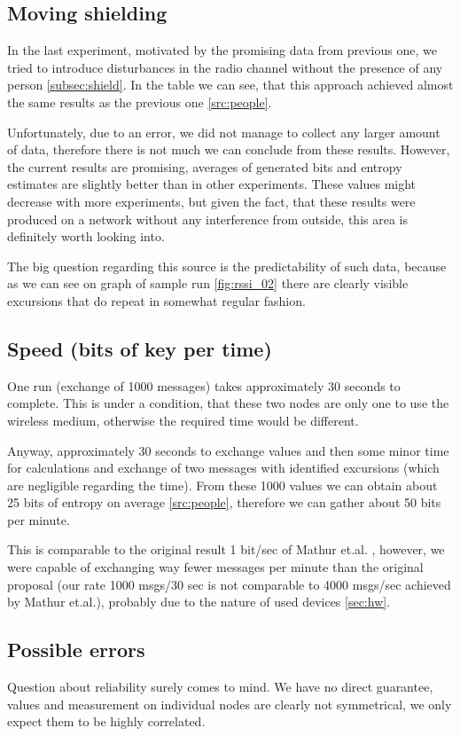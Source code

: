 \documentclass[
  print, %
  table,   %
  nolof,     %
  nolot,     %
           oneside
]{fithesis3}
\begin{document}
  \subsection{Moving shielding}\label{src:shield}
  In the last experiment, motivated by the promising data from previous one, we tried to introduce disturbances in the radio channel without the presence of any person \ref{subsec:shield}. In the table we can see, that this approach achieved almost the same results as the previous one \ref{src:people}.

  Unfortunately, due to an error, we did not manage to collect any larger amount of data, therefore there is not much we can conclude from these results. However, the current results are promising, averages of generated bits and entropy estimates are slightly better than in other experiments.  These values might decrease with more experiments, but given the fact, that these results were produced on a network without any interference from outside, this area is definitely worth looking into.

  The big question regarding this source is the predictability of such data, because as we can see on graph of sample run \ref{fig:rssi_02}
  there are clearly visible excursions that do repeat in somewhat regular fashion.


  \subsection{Speed (bits of key per time)}
  One run (exchange of 1000 messages) takes approximately 30 seconds to complete. This is under a condition, that these two nodes are only one to use the wireless medium, otherwise the required time would be different.

  Anyway, approximately 30 seconds to exchange values and then some minor time for calculations and exchange of two messages with identified excursions (which are negligible regarding the time).  From these 1000 values we can obtain about 25 bits of entropy on average \ref{src:people}, therefore we can gather about 50 bits per minute.

  This is comparable to the original result 1 bit/sec of Mathur et.al. \cite{Mathur2008Rssi}, however, we were capable of exchanging way fewer messages per minute than the original proposal (our rate 1000 msgs/30 sec is not comparable to 4000 msgs/sec achieved by Mathur et.al.), probably due to the nature of used devices \ref{sec:hw}.
  \subsection{Possible errors}
  Question about reliability surely comes to mind. We have no direct guarantee, values and measurement on individual nodes are clearly not symmetrical, we only expect them to be highly correlated.
\end{document}
